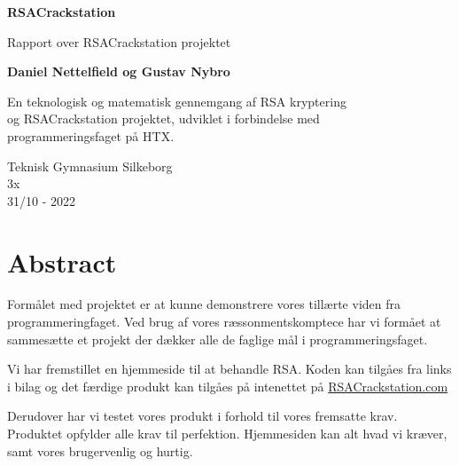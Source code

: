 \documentclass[a4paper,12pt]{extarticle}
\begin{document}
    \begin{titlepage}
        \begin{center}
            \vspace{1cm}

            \textbf{RSACrackstation}

            \vspace{0.5cm}
            Rapport over RSACrackstation projektet

            \vspace{1.5cm}

            \textbf{Daniel Nettelfield og Gustav Nybro}

            \vfill

            En teknologisk og matematisk gennemgang af RSA kryptering\\
            og RSACrackstation projektet, udviklet i forbindelse med\\
            programmeringsfaget på HTX.\@

            \vspace{0.8cm}

            Teknisk Gymnasium Silkeborg\\
            3x\\
            31/10 - 2022

        \end{center}
    \end{titlepage}

    \newpage

    \tableofcontents

    \newpage


    \section{Abstract}\label{sec:abstract}

    Formålet med projektet er at kunne demonstrere vores tillærte viden fra programmeringfaget.
    Ved brug af vores ræssonmentskomptece har vi formået at sammesætte et projekt der dækker alle de faglige mål i programmeringsfaget.

    Vi har fremstillet en hjemmeside til at behandle RSA. Koden kan tilgåes fra links i bilag og det færdige produkt kan tilgåes på intenettet på \href{https://rsacrackstation.com}{RSACrackstation.com}

    Derudover har vi testet vores produkt i forhold til vores fremsatte krav. Produktet opfylder alle krav til perfektion. Hjemmesiden kan alt hvad vi kræver, samt vores brugervenlig og hurtig.
\end{document}
